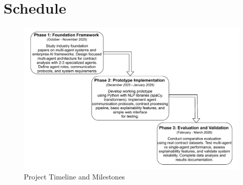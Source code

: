 
\section{Schedule}\label{section:schedule}

\begin{figure}[htbp]
\centering
\includegraphics[width=\textwidth,height=0.5\textheight]{figures/s.drawio.pdf}
\caption{Project Timeline and Milestones}
\label{fig:schedule}
\end{figure}
